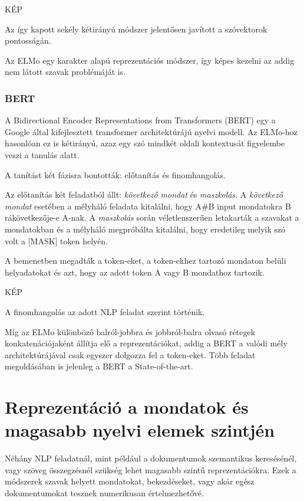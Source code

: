 KÉP

Az így kapott sekély kétirányú módszer jelentősen javított a szóvektorok pontosságán.

\begin{note}
	Az ELMo egy karakter alapú reprezentációs módszer, így képes kezelni az addig nem látott szavak problémáját is.
\end{note}

\subsubsection{BERT}
A Bidirectional Encoder Representations from Transformers (BERT) egy a Google által kifejlesztett transformer architektúrájú nyelvi modell. Az ELMo-hoz hasonlóan ez is kétirányú, azaz egy szó mindkét oldali kontextusát figyelembe veszi a tanulás alatt. 

A tanítást két fázisra bontották: előtanítás és finomhangolás.

Az előtanítás két feladatból állt: \textit{következő mondat} és \textit{maszkolás}. A \textit{következő mondat} esetében a mélyháló feladata kitalálni, hogy A\#B input mondatokra B rákövetkezője-e A-nak. A \textit{maszkolás} során véletlenszerűen letakarták a szavakat a mondatokban és a mélyháló megpróbálta kitalálni, hogy eredetileg melyik szó volt a [MASK] token helyén.

A bemenetben megadták a token-eket, a token-ekhez tartozó mondaton belüli helyadatokat és azt, hogy az adott token A vagy B mondathoz tartozik.

KÉP

A finomhangolás az adott NLP feladat szerint történik.

\begin{note}
	Míg az ELMo különböző balról-jobbra és jobbról-balra olvasó rétegek konkatenációjaként állítja elő a reprezentációkat, addig a BERT a valódi mély architektúrájával csak egyszer dolgozza fel a token-eket. Több feladat megoldásában is jelenleg a BERT a State-of-the-art.
\end{note}



\section{Reprezentáció a mondatok és magasabb nyelvi elemek szintjén}
Néhány NLP feladatnál, mint például a dokumentumok szemantikus keresésénél, vagy szöveg összegzésnél szükség lehet magasabb szintű reprezentációkra. Ezek a módszerek szavak helyett mondatokat, bekezdéseket, vagy akár egész dokumentumokat tesznek numerikusan értelmezhetővé. 

